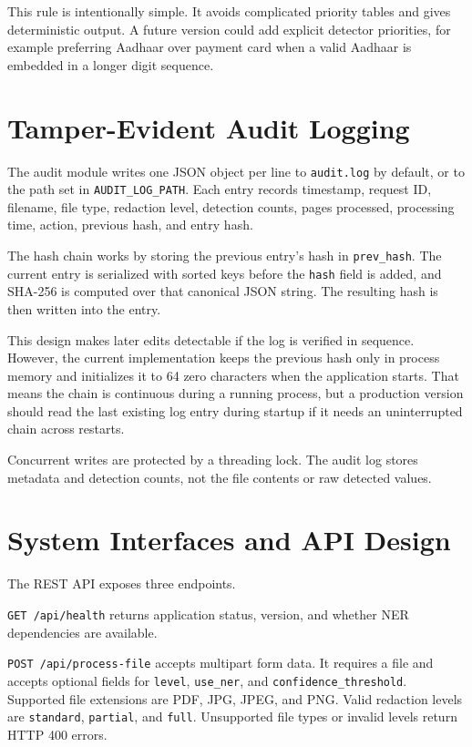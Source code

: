 This rule is intentionally simple. It avoids complicated priority tables and gives deterministic output. A future version could add explicit detector priorities, for example preferring Aadhaar over payment card when a valid Aadhaar is embedded in a longer digit sequence.

\section{Tamper-Evident Audit Logging}

The audit module writes one JSON object per line to \texttt{audit.log} by default, or to the path set in \texttt{AUDIT\_LOG\_PATH}. Each entry records timestamp, request ID, filename, file type, redaction level, detection counts, pages processed, processing time, action, previous hash, and entry hash.

The hash chain works by storing the previous entry's hash in \texttt{prev\_hash}. The current entry is serialized with sorted keys before the \texttt{hash} field is added, and SHA-256 is computed over that canonical JSON string. The resulting hash is then written into the entry.

This design makes later edits detectable if the log is verified in sequence. However, the current implementation keeps the previous hash only in process memory and initializes it to 64 zero characters when the application starts. That means the chain is continuous during a running process, but a production version should read the last existing log entry during startup if it needs an uninterrupted chain across restarts.

Concurrent writes are protected by a threading lock. The audit log stores metadata and detection counts, not the file contents or raw detected values.

\section{System Interfaces and API Design}

The REST API exposes three endpoints.

\texttt{GET /api/health} returns application status, version, and whether NER dependencies are available.

\texttt{POST /api/process-file} accepts multipart form data. It requires a file and accepts optional fields for \texttt{level}, \texttt{use\_ner}, and \texttt{confidence\_threshold}. Supported file extensions are PDF, JPG, JPEG, and PNG. Valid redaction levels are \texttt{standard}, \texttt{partial}, and \texttt{full}. Unsupported file types or invalid levels return HTTP 400 errors.

